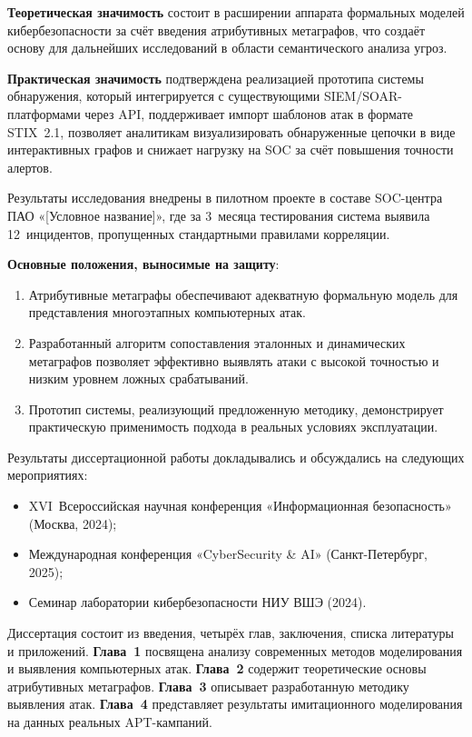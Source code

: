 \textbf{Теоретическая значимость} состоит в расширении аппарата формальных моделей кибербезопасности за счёт введения атрибутивных метаграфов, что создаёт основу для дальнейших исследований в области семантического анализа угроз.

\textbf{Практическая значимость} подтверждена реализацией прототипа системы обнаружения, который интегрируется с существующими SIEM/SOAR-платформами через API, поддерживает импорт шаблонов атак в формате STIX~2.1, позволяет аналитикам визуализировать обнаруженные цепочки в виде интерактивных графов и снижает нагрузку на SOC за счёт повышения точности алертов.

Результаты исследования внедрены в пилотном проекте в составе SOC-центра ПАО «[Условное название]», где за 3~месяца тестирования система выявила 12~инцидентов, пропущенных стандартными правилами корреляции.

\textbf{Основные положения, выносимые на защиту}:
\begin{enumerate}
    \item Атрибутивные метаграфы обеспечивают адекватную формальную модель для представления многоэтапных компьютерных атак.
    \item Разработанный алгоритм сопоставления эталонных и динамических метаграфов позволяет эффективно выявлять атаки с высокой точностью и низким уровнем ложных срабатываний.
    \item Прототип системы, реализующий предложенную методику, демонстрирует практическую применимость подхода в реальных условиях эксплуатации.
\end{enumerate}

Результаты диссертационной работы докладывались и обсуждались на следующих мероприятиях:
\begin{itemize}
    \item XVI~Всероссийская научная конференция «Информационная безопасность» (Москва, 2024);
    \item Международная конференция «CyberSecurity \& AI» (Санкт-Петербург, 2025);
    \item Семинар лаборатории кибербезопасности НИУ ВШЭ (2024).
\end{itemize}

Диссертация состоит из введения, четырёх глав, заключения, списка литературы и приложений.  
\textbf{Глава~1} посвящена анализу современных методов моделирования и выявления компьютерных атак.  
\textbf{Глава~2} содержит теоретические основы атрибутивных метаграфов.  
\textbf{Глава~3} описывает разработанную методику выявления атак.  
\textbf{Глава~4} представляет результаты имитационного моделирования на данных реальных APT-кампаний.